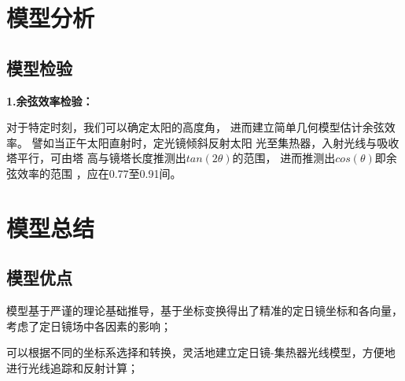 \documentclass{数学建模}
\begin{document}





\section{模型分析}

\subsection{模型检验}
\textbf{1.余弦效率检验：}

对于特定时刻，我们可以确定太阳的高度角，
进而建立简单几何模型估计余弦效率。
譬如当正午太阳直射时，定光镜倾斜反射太阳
光至集热器，入射光线与吸收塔平行，可由塔
高与镜塔长度推测出$tan(2\theta)$的范围，
进而推测出$cos(\theta)$即余弦效率的范围
，应在0.77至0.91间。

\section{模型总结}
\subsection{模型优点}
模型基于严谨的理论基础推导，基于坐标变换得出了精准的定日镜坐标和各向量，考虑了定日镜场中各因素的影响；

可以根据不同的坐标系选择和转换，灵活地建立定日镜-集热器光线模型，方便地进行光线追踪和反射计算；
\end{document}
